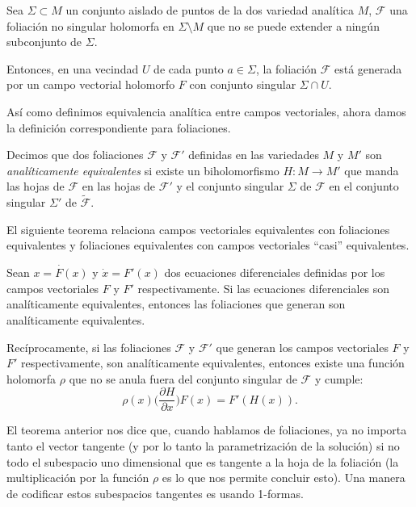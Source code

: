 \begin{Teorema}
\label{Teo:FoliacionesGeneradas}
Sea $\Sigma\subset M$ un conjunto aislado de puntos de la dos variedad analítica $M$, $\mathcal{F}$ una foliación no singular holomorfa en $\Sigma\setminus M$ que no se puede extender a ningún subconjunto de $\Sigma$.

Entonces, en una vecindad $U$ de cada punto $a\in\Sigma$, la foliación $\mathcal{F}$ está generada por un campo vectorial holomorfo $F$ con conjunto singular $\Sigma\cap U$.
\end{Teorema} 

Así como definimos equivalencia analítica entre campos vectoriales, ahora damos la definición correspondiente para foliaciones.

\begin{defn}
Decimos que dos foliaciones $\mathcal{F}$ y $\mathcal{F}'$ definidas en las variedades $M$ y $M'$ son \emph{analíticamente equivalentes} si existe un biholomorfismo $H\colon M\rightarrow M'$ que manda las hojas de $\mathcal{F}$ en las hojas de $\mathcal{F}'$ y el conjunto singular $\Sigma$ de $\mathcal{F}$ en el conjunto singular $\Sigma'$ de $\tilde{\mathcal{F}}$.
\end{defn}

El siguiente teorema relaciona campos vectoriales equivalentes con foliaciones equivalentes y foliaciones equivalentes con campos vectoriales ``casi'' equivalentes.

\begin{Teorema}
\label{Teo:CamposEquivalentes}
Sean $\dot{x=F(x)}$ y $\dot{x}=F'(x)$ dos ecuaciones diferenciales definidas por los campos vectoriales $F$ y $F'$ respectivamente. Si las ecuaciones diferenciales son analíticamente equivalentes, entonces las foliaciones que generan son analíticamente equivalentes.

Recíprocamente, si las foliaciones $\mathcal{F}$ y $\mathcal{F}'$ que generan los campos vectoriales $F$ y $F'$ respectivamente, son analíticamente equivalentes, entonces existe una función holomorfa $\rho$ que no se anula fuera del conjunto singular de $\mathcal{F}$ y cumple:
\begin{equation}
\rho(x)\Big( \frac{\partial H}{\partial x}\Big)F(x) = F'(H(x)).
\end{equation} 
\end{Teorema}

El teorema anterior nos dice que, cuando hablamos de foliaciones, ya no importa tanto el vector tangente (y por lo tanto la parametrización de la solución) si no todo el subespacio uno dimensional que es tangente a la hoja de la foliación (la multiplicación por la función $\rho$ es lo que nos permite concluir esto). Una manera de codificar estos subespacios tangentes es usando 1-formas.\\

